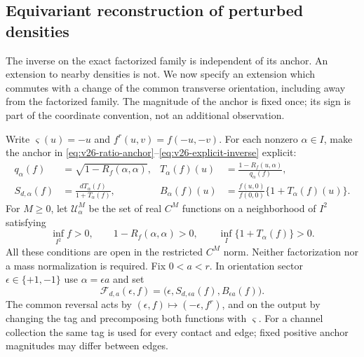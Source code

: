 \subsection{Equivariant reconstruction of perturbed densities}
\label{subsec:v29-equivariant-density}

The inverse on the exact factorized family is independent of its anchor.
An extension to nearby densities is not.  We now specify an extension which
commutes with a change of the common transverse orientation, including away
from the factorized family.  The magnitude of the anchor is fixed once; its
sign is part of the coordinate convention, not an additional observation.

Write \(\varsigma(u)=-u\) and \(f^r(u,v)=f(-u,-v)\).  For each nonzero
\(\alpha\in I\), make the anchor in
\eqref{eq:v26-ratio-anchor}--\eqref{eq:v26-explicit-inverse} explicit:
\begin{align}
 q_\alpha(f)&=\sqrt{1-R_f(\alpha,\alpha)},&
 T_\alpha(f)(u)&=\frac{1-R_f(u,\alpha)}{q_\alpha(f)},
                                      \label{eq:v29-anchor-formulas}\\
 S_{d,\alpha}(f)&=\frac{dT_\alpha(f)}{1+T_\alpha(f)},&
 B_\alpha(f)(u)&=\frac{f(u,0)}{f(0,0)}\{1+T_\alpha(f)(u)\}.
                                      \label{eq:v29-action-amplitude}
\end{align}
For \(M\ge0\), let \(\mathcal U^M_\alpha\) be the set of real \(C^M\)
functions on a neighborhood of \(I^2\) satisfying
\begin{equation}\label{eq:v29-formula-domain}
 \inf_{I^2}f>0,\qquad 1-R_f(\alpha,\alpha)>0,\qquad
                  \inf_I\{1+T_\alpha(f)\}>0.
\end{equation}
All these conditions are open in the restricted \(C^M\) norm.  Neither
factorization nor a mass normalization is required.  Fix \(0<a<r\).  In
orientation sector \(\epsilon\in\{+1,-1\}\) use \(\alpha=\epsilon a\)
and set
\[
 \mathcal F_{d,a}(\epsilon,f)
       =\bigl(\epsilon,S_{d,\epsilon a}(f),B_{\epsilon a}(f)\bigr).
\]
The common reversal acts by \((\epsilon,f)\mapsto(-\epsilon,f^r)\), and on
the output by changing the tag and precomposing both functions with
\(\varsigma\).  For a channel collection the same tag is used for every
contact and edge; fixed positive anchor magnitudes may differ between edges.

